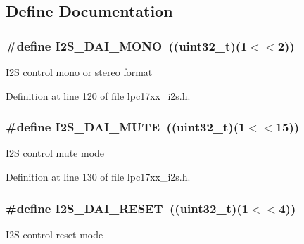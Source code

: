 \subsection{\-Define \-Documentation}
\hypertarget{group___i2_s___private___macros_ga352feb095d028efc44d17f72beacfae5}{
\subsubsection[{\-I2\-S\-\_\-\-D\-A\-I\-\_\-\-M\-O\-N\-O}]{\setlength{\rightskip}{0pt plus 5cm}\#define {\bf \-I2\-S\-\_\-\-D\-A\-I\-\_\-\-M\-O\-N\-O}~((uint32\-\_\-t)(1$<$$<$2))}}\label{group___i2_s___private___macros_ga352feb095d028efc44d17f72beacfae5}
\-I2\-S control mono or stereo format 

\-Definition at line 120 of file lpc17xx\-\_\-i2s.\-h.

\hypertarget{group___i2_s___private___macros_ga29f425732f2c019dd69819f7a01740ad}{
\subsubsection[{\-I2\-S\-\_\-\-D\-A\-I\-\_\-\-M\-U\-T\-E}]{\setlength{\rightskip}{0pt plus 5cm}\#define {\bf \-I2\-S\-\_\-\-D\-A\-I\-\_\-\-M\-U\-T\-E}~((uint32\-\_\-t)(1$<$$<$15))}}\label{group___i2_s___private___macros_ga29f425732f2c019dd69819f7a01740ad}
\-I2\-S control mute mode 

\-Definition at line 130 of file lpc17xx\-\_\-i2s.\-h.

\hypertarget{group___i2_s___private___macros_gae57a0b564a399a726a9a6737f5733beb}{
\subsubsection[{\-I2\-S\-\_\-\-D\-A\-I\-\_\-\-R\-E\-S\-E\-T}]{\setlength{\rightskip}{0pt plus 5cm}\#define {\bf \-I2\-S\-\_\-\-D\-A\-I\-\_\-\-R\-E\-S\-E\-T}~((uint32\-\_\-t)(1$<$$<$4))}}\label{group___i2_s___private___macros_gae57a0b564a399a726a9a6737f5733beb}
\-I2\-S control reset mode 

